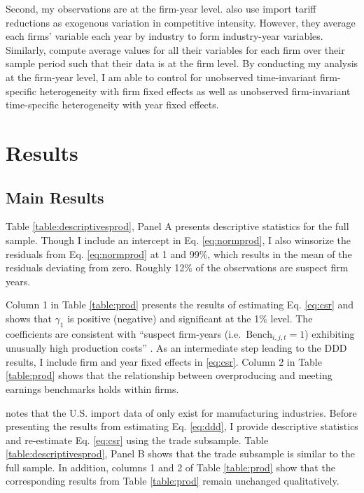 \documentclass[notitlepage, 12pt]{article}
\begin{document}
\noindent Second, my observations are at the firm-year level. \citet{bc:2012} also use import tariff reductions as exogenous variation in competitive intensity. However, they average each firms' variable each year by industry to form industry-year variables. Similarly, \citet{kst:2012} compute average values for all their variables for each firm over their sample period such that their data is at the firm level. By conducting my analysis at the firm-year level, I am able to control for unobserved time-invariant firm-specific heterogeneity with firm fixed effects as well as unobserved firm-invariant time-specific heterogeneity with year fixed effects.

\section{Results}\label{results}
\subsection{Main Results}
\noindent Table \ref{table:descriptivesprod}, Panel A presents descriptive statistics for the full sample. Though I include an intercept in Eq. \eqref{eq:normprod}, I also winsorize the residuals from Eq. \eqref{eq:normprod} at 1 and 99\%, which results in the mean of the residuals deviating from zero. Roughly 12\% of the observations are suspect firm years.
\newline

\noindent Column 1 in Table \ref{table:prod} presents the results of estimating Eq. \eqref{eq:csr} and shows that $\gamma_{1}$ is positive (negative) and significant at the 1\% level. The coefficients are consistent with ``suspect firm-years (i.e.\ $\text{Bench}_{i,j,t} = 1$) exhibiting unusually high production costs'' \citep{roychowdhury:2006}. As an intermediate step leading to the DDD results, I include firm and year fixed effects in \eqref{eq:csr}. Column 2 in Table \ref{table:prod} shows that the relationship between overproducing and meeting earnings benchmarks holds within firms.
\newline

\noindent \citet{valta:2012} notes that the U.S. import data of \citet{schott:2010} only exist for manufacturing industries. Before presenting the results from estimating Eq. \eqref{eq:ddd}, I provide descriptive statistics and re-estimate Eq. \eqref{eq:csr} using the trade subsample. Table \ref{table:descriptivesprod}, Panel B shows that the trade subsample is similar to the full sample. In addition, columns 1 and 2 of Table \ref{table:prod} show that the corresponding results from Table \ref{table:prod} remain unchanged qualitatively.
\newline
\end{document}
